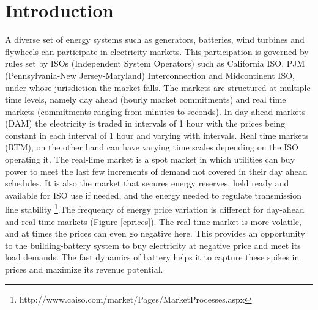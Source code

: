 \documentclass[11pt,twoside]{article}
\begin{document}
\section{Introduction}
A diverse set of energy systems such as generators, batteries, wind turbines and flywheels can participate in electricity markets. This participation is governed by rules set by ISOs (Independent System Operators) such as California ISO, PJM (Pennsylvania-New Jersey-Maryland) Interconnection and Midcontinent ISO, under whose jurisdiction the market falls. The markets are structured at multiple time levels, namely day ahead (hourly market commitments) and real time markets (commitments ranging from minutes to seconds). In day-ahead markets (DAM) the electricity is traded in intervals of 1 hour with the prices being constant in each interval of 1 hour and varying with intervals. Real time markets (RTM), on the other hand can have varying time scales depending on the ISO operating it. The real-lime market is a spot market in which utilities can buy power to meet the last few increments of demand not covered in their day ahead schedules. It is also the market that secures energy reserves, held ready and available for ISO use if needed, and the energy needed to regulate transmission line stability \footnote{http://www.caiso.com/market/Pages/MarketProcesses.aspx}.The frequency of energy price variation is different for day-ahead and real time markets (Figure \ref{eprices}). The real time market is more volatile, and at times the prices can even go negative here. This provides an opportunity to the building-battery system to buy electricity at negative price and meet its load demands. The fast dynamics of battery helps it to capture these spikes in prices and maximize its revenue potential. 
\end{document}
